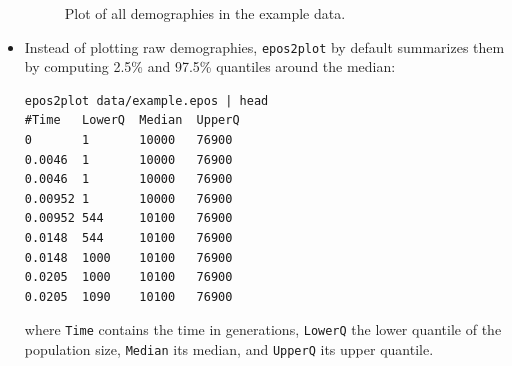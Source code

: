 \documentclass[a4paper]{article}
\newcommand{\ty}{\texttt}
\begin{document}
\begin{itemize}
\begin{figure}
\begin{center}
\end{center}
\caption{Plot of all demographies in the example data.}\label{fig:all}
\end{figure}

\item  Instead of plotting raw demographies, \ty{epos2plot} by default
  summarizes them by computing 2.5\% and 97.5\% quantiles around the
  median:
\begin{verbatim}
epos2plot data/example.epos | head
#Time   LowerQ	Median	UpperQ
0       1       10000   76900
0.0046  1       10000   76900
0.0046  1       10000   76900
0.00952 1       10000   76900
0.00952 544     10100   76900
0.0148  544     10100   76900
0.0148  1000    10100   76900
0.0205  1000    10100   76900
0.0205  1090    10100   76900
\end{verbatim}
where \ty{Time} contains the time in generations, \ty{LowerQ} the
lower quantile of the population size, \ty{Median} its median, and
\ty{UpperQ} its upper quantile.


\end{itemize}
\end{document}
